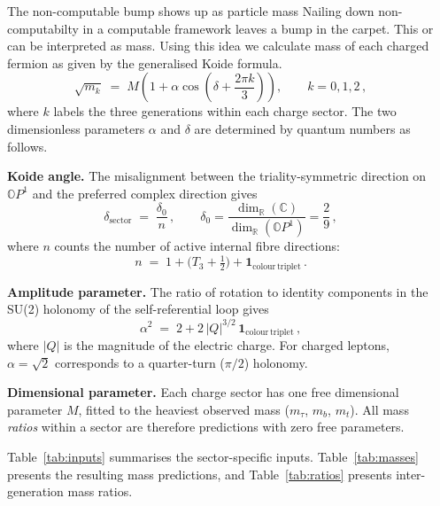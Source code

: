 \documentclass[final]{beamer}
\newlength{\sepwidth}
\newlength{\colwidth}
\newcommand{\separatorcolumn}{\begin{column}{\sepwidth}\end{column}}
\begin{document}
\begin{frame}[t]
\begin{columns}[t]
\separatorcolumn

\begin{column}{\colwidth}

\begin{block}{The non-computable bump shows up as particle mass}
Nailing down non-computabilty in a computable framework leaves a bump in the carpet. This  or  can be interpreted as mass. Using this idea we calculate mass of each charged fermion as given by the generalised Koide formula.
\begin{equation}
  \label{eq:koide}
  \sqrt{m_k} \;=\; M\!\left(1 + \alpha\cos\!\left(\delta + \frac{2\pi k}{3}\right)\right), \qquad k = 0, 1, 2\,,
\end{equation}
where $k$ labels the three generations within each charge sector. The two dimensionless parameters $\alpha$ and $\delta$ are determined by quantum numbers as follows.

\textbf{Koide angle.} The misalignment between the triality-symmetric direction on $\mathbb{O}P^1$ and the preferred complex direction gives
\begin{equation}
  \label{eq:delta}
  \delta_{\mathrm{sector}} \;=\; \frac{\delta_0}{n}\,, \qquad \delta_0 = \frac{\dim_{\mathbb{R}}(\mathbb{C})}{\dim_{\mathbb{R}}(\mathbb{O}P^1)} = \frac{2}{9}\,,
\end{equation}
where $n$ counts the number of active internal fibre directions:
\begin{equation}
  n \;=\; 1 + \bigl(T_3 + \tfrac{1}{2}\bigr) + \mathbf{1}_{\mathrm{colour\,triplet}}\,.
\end{equation}

\textbf{Amplitude parameter.} The ratio of rotation to identity components in the SU(2) holonomy of the self-referential loop gives
\begin{equation}
  \label{eq:alpha}
  \alpha^2 \;=\; 2 + 2\,|Q|^{3/2}\,\mathbf{1}_{\mathrm{colour\,triplet}}\,,
\end{equation}
where $|Q|$ is the magnitude of the electric charge. For charged leptons, $\alpha = \sqrt{2}$ corresponds to a quarter-turn ($\pi/2$) holonomy.

\textbf{Dimensional parameter.} Each charge sector has one free dimensional parameter $M$, fitted to the heaviest observed mass ($m_\tau$, $m_b$, $m_t$). All mass \emph{ratios} within a sector are therefore predictions with zero free parameters.

Table~\ref{tab:inputs} summarises the sector-specific inputs. Table~\ref{tab:masses} presents the resulting mass predictions, and Table~\ref{tab:ratios} presents inter-generation mass ratios.


\end{block}
\end{column}
\end{columns}
\end{frame}
\end{document}
